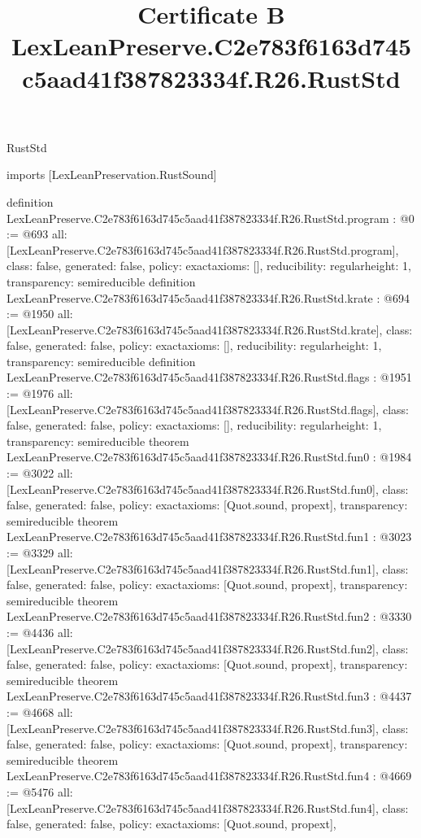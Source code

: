 \begin{lexlean}{RustStd}
\title{Certificate B LexLeanPreserve.C2e783f6163d745c5aad41f387823334f.R26.RustStd}
\begin{coremodule}
imports [LexLeanPreservation.RustSound]

definition LexLeanPreserve.C2e783f6163d745c5aad41f387823334f.R26.RustStd.program : @0 := @693 {
  all: [LexLeanPreserve.C2e783f6163d745c5aad41f387823334f.R26.RustStd.program],
  class: false,
  generated: false,
  policy: exact{axioms: []},
  reducibility: regular{height: 1},
  transparency: semireducible
}
definition LexLeanPreserve.C2e783f6163d745c5aad41f387823334f.R26.RustStd.krate : @694 := @1950 {
  all: [LexLeanPreserve.C2e783f6163d745c5aad41f387823334f.R26.RustStd.krate],
  class: false,
  generated: false,
  policy: exact{axioms: []},
  reducibility: regular{height: 1},
  transparency: semireducible
}
definition LexLeanPreserve.C2e783f6163d745c5aad41f387823334f.R26.RustStd.flags : @1951 := @1976 {
  all: [LexLeanPreserve.C2e783f6163d745c5aad41f387823334f.R26.RustStd.flags],
  class: false,
  generated: false,
  policy: exact{axioms: []},
  reducibility: regular{height: 1},
  transparency: semireducible
}
theorem LexLeanPreserve.C2e783f6163d745c5aad41f387823334f.R26.RustStd.fun0 : @1984 := @3022 {
  all: [LexLeanPreserve.C2e783f6163d745c5aad41f387823334f.R26.RustStd.fun0],
  class: false,
  generated: false,
  policy: exact{axioms: [Quot.sound, propext]},
  transparency: semireducible
}
theorem LexLeanPreserve.C2e783f6163d745c5aad41f387823334f.R26.RustStd.fun1 : @3023 := @3329 {
  all: [LexLeanPreserve.C2e783f6163d745c5aad41f387823334f.R26.RustStd.fun1],
  class: false,
  generated: false,
  policy: exact{axioms: [Quot.sound, propext]},
  transparency: semireducible
}
theorem LexLeanPreserve.C2e783f6163d745c5aad41f387823334f.R26.RustStd.fun2 : @3330 := @4436 {
  all: [LexLeanPreserve.C2e783f6163d745c5aad41f387823334f.R26.RustStd.fun2],
  class: false,
  generated: false,
  policy: exact{axioms: [Quot.sound, propext]},
  transparency: semireducible
}
theorem LexLeanPreserve.C2e783f6163d745c5aad41f387823334f.R26.RustStd.fun3 : @4437 := @4668 {
  all: [LexLeanPreserve.C2e783f6163d745c5aad41f387823334f.R26.RustStd.fun3],
  class: false,
  generated: false,
  policy: exact{axioms: [Quot.sound, propext]},
  transparency: semireducible
}
theorem LexLeanPreserve.C2e783f6163d745c5aad41f387823334f.R26.RustStd.fun4 : @4669 := @5476 {
  all: [LexLeanPreserve.C2e783f6163d745c5aad41f387823334f.R26.RustStd.fun4],
  class: false,
  generated: false,
  policy: exact{axioms: [Quot.sound, propext]},
}
\end{coremodule}
\end{lexlean}

